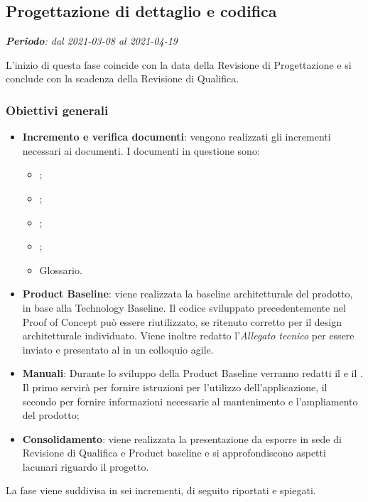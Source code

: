\subsection{Progettazione di dettaglio e codifica}
\textit{\textbf{Periodo}: dal 2021-03-08 al 2021-04-19}

L'inizio di questa fase coincide con la data della Revisione di Progettazione e si conclude con la scadenza della Revisione di Qualifica.

\subsubsection{Obiettivi generali}

\begin{itemize}
\item \textbf{Incremento e verifica documenti}: vengono realizzati gli incrementi necessari ai documenti. I documenti in questione sono:
\begin{itemize}
\item \NdP{};
\item \AdR{};
\item \PdQ{};
\item \PdP{};
\item Glossario.
\end{itemize}
\item \textbf{Product Baseline}: viene realizzata la baseline architetturale del prodotto, in base alla Technology Baseline. Il codice sviluppato precedentemente nel Proof of Concept può essere riutilizzato, se ritenuto corretto per il design architetturale individuato. Viene inoltre redatto l'\textit{Allegato tecnico} per essere inviato e presentato al \CR{} in un colloquio agile.\\
\item \textbf{Manuali}: Durante lo sviluppo della Product Baseline verranno redatti il \MU{} e il \MM. Il primo servirà per fornire istruzioni per l'utilizzo dell'applicazione, il secondo per fornire informazioni necessarie al mantenimento e l'ampliamento del prodotto;
\item \textbf{Consolidamento}: viene realizzata la presentazione da esporre in sede di Revisione di Qualifica e Product baseline e si approfondiscono aspetti lacunari riguardo il progetto.
\end{itemize}

La fase viene suddivisa in sei incrementi, di seguito riportati e spiegati.


\newpage

\newpage

\newpage

\newpage

\newpage

\newpage
